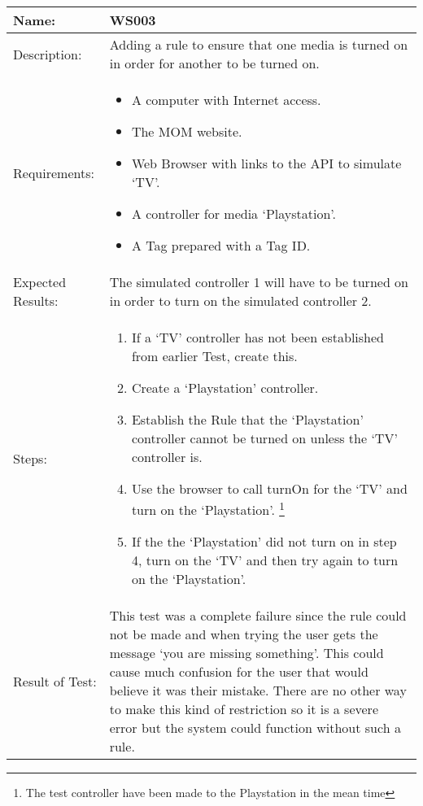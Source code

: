 \begin{table}[h]
	\centering
		\begin{tabular}{|l|p{9cm}|}
		\hline
		\hline
		Name: & WS003\\
		\hline
		Description: & Adding a rule to ensure that one media is turned on in order for another to be turned on.\\
		\hline
		Requirements: &
		\begin{itemize}
			\item A computer with Internet access.
			\item The MOM website.
			\item Web Browser with links to the API to simulate `TV'.
			\item A controller for media `Playstation'.
			\item A Tag prepared with a Tag ID.
		\end{itemize}
		\\
		\hline
		Expected Results: & The simulated controller 1 will have to be turned on in order to turn on the simulated controller 2.\\
		\hline
		Steps: & 
		\begin{enumerate}
			\item If a `TV' controller has not been established from earlier Test, create this.
			\item Create a `Playstation' controller.
			\item Establish the Rule that the `Playstation' controller cannot be turned on unless the `TV' controller is.
			\item Use the browser to call turnOn for the `TV' and turn on the `Playstation'. \footnote{The test controller have been made to the Playstation in the mean time}
			\item If the the `Playstation' did not turn on in step 4, turn on the `TV' and then try again to turn on the `Playstation'.
		\end{enumerate}
		\\		
		\hline
		Result of Test: & This test was a complete failure since the rule could not be made and when trying the user gets the message `you are missing something'. This could cause much confusion for the user that would believe it was their mistake. There are no other way to make this kind of restriction so it is a severe error but the system could function without such a rule.\\
		\hline
		\end{tabular}
\end{table}


